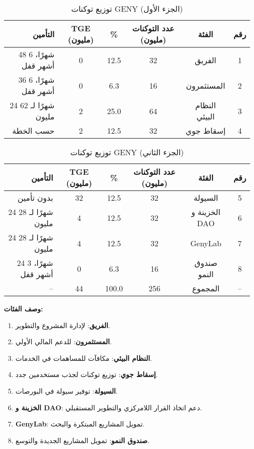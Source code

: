 \documentclass[a4paper,12pt,openany]{book}
\begin{document}
\begin{table}[h]
\centering
\caption{توزيع توكنات GENY (الجزء الأول)}
\small
\begin{tabular}{r c c c c c}
\hline
\textbf{التأمين} & \textbf{TGE (مليون)} & \textbf{\%} & \textbf{عدد التوكنات (مليون)} & \textbf{الفئة} & \textbf{رقم} \\
\hline
48 شهرًا، 6 أشهر قفل & 0 & 12.5 & 32 & الفريق & 1 \\
36 شهرًا، 6 أشهر قفل & 0 & 6.3 & 16 & المستثمرون & 2 \\
24 شهرًا لـ 62 مليون & 2 & 25.0 & 64 & النظام البيئي & 3 \\
حسب الخطة & 2 & 12.5 & 32 & إسقاط جوي & 4 \\
\hline
\end{tabular}
\end{table}

\begin{table}[h]
\centering
\caption{توزيع توكنات GENY (الجزء الثاني)}
\small
\begin{tabular}{r c c c c c}
\hline
\textbf{التأمين} & \textbf{TGE (مليون)} & \textbf{\%} & \textbf{عدد التوكنات (مليون)} & \textbf{الفئة} & \textbf{رقم} \\
\hline
بدون تأمين & 32 & 12.5 & 32 & السيولة & 5 \\
24 شهرًا لـ 28 مليون & 4 & 12.5 & 32 & الخزينة و DAO & 6 \\
24 شهرًا لـ 28 مليون & 4 & 12.5 & 32 & GenyLab & 7 \\
24 شهرًا، 3 أشهر قفل & 0 & 6.3 & 16 & صندوق النمو & 8 \\
\hline
-- & 44 & 100.0 & 256 & المجموع & -- \\
\hline
\end{tabular}
\end{table}

\textbf{وصف الفئات:}
\begin{enumerate}
    \item \textbf{الفريق}: لإدارة المشروع والتطوير.
    \item \textbf{المستثمرون}: للدعم المالي الأولي.
    \item \textbf{النظام البيئي}: مكافآت للمساهمات في الخدمات.
    \item \textbf{إسقاط جوي}: توزيع توكنات لجذب مستخدمين جدد.
    \item \textbf{السيولة}: توفير سيولة في البورصات.
    \item \textbf{الخزينة و DAO}: دعم اتخاذ القرار اللامركزي والتطوير المستقبلي.
    \item \textbf{GenyLab}: تمويل المشاريع المبتكرة والبحث.
    \item \textbf{صندوق النمو}: تمويل المشاريع الجديدة والتوسع.
\end{enumerate}
\end{document}
